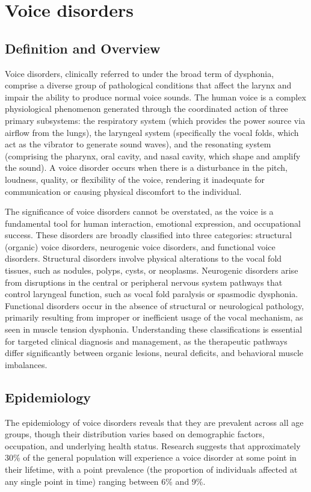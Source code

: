 \chapter{Voice disorders}

\section*{Definition and Overview}
Voice disorders, clinically referred to under the broad term of dysphonia, comprise a diverse group of pathological conditions that affect the larynx and impair the ability to produce normal voice sounds. The human voice is a complex physiological phenomenon generated through the coordinated action of three primary subsystems: the respiratory system (which provides the power source via airflow from the lungs), the laryngeal system (specifically the vocal folds, which act as the vibrator to generate sound waves), and the resonating system (comprising the pharynx, oral cavity, and nasal cavity, which shape and amplify the sound). A voice disorder occurs when there is a disturbance in the pitch, loudness, quality, or flexibility of the voice, rendering it inadequate for communication or causing physical discomfort to the individual.

The significance of voice disorders cannot be overstated, as the voice is a fundamental tool for human interaction, emotional expression, and occupational success. These disorders are broadly classified into three categories: structural (organic) voice disorders, neurogenic voice disorders, and functional voice disorders. Structural disorders involve physical alterations to the vocal fold tissues, such as nodules, polyps, cysts, or neoplasms. Neurogenic disorders arise from disruptions in the central or peripheral nervous system pathways that control laryngeal function, such as vocal fold paralysis or spasmodic dysphonia. Functional disorders occur in the absence of structural or neurological pathology, primarily resulting from improper or inefficient usage of the vocal mechanism, as seen in muscle tension dysphonia. Understanding these classifications is essential for targeted clinical diagnosis and management, as the therapeutic pathways differ significantly between organic lesions, neural deficits, and behavioral muscle imbalances.

\section*{Epidemiology}
The epidemiology of voice disorders reveals that they are prevalent across all age groups, though their distribution varies based on demographic factors, occupation, and underlying health status. Research suggests that approximately 30\% of the general population will experience a voice disorder at some point in their lifetime, with a point prevalence (the proportion of individuals affected at any single point in time) ranging between 6\% and 9\%.

